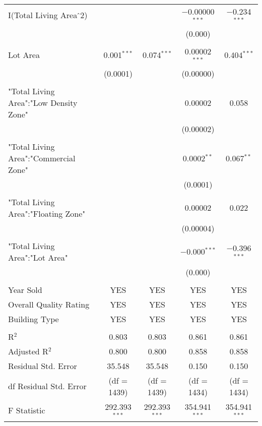 \documentclass[a4paper]{article}
\begin{document}
\begin{table}[!htbp]
\begin{adjustwidth}{-0.0cm}{-0cm}
\begin{threeparttable}
\begin{tabular}{@{\extracolsep{-1pt}}lcccc}
 I(Total Living Area$\hat{\mkern6mu}$2) &  &  & $-$0.00000$^{***}$ & $-$0.234$^{***}$ \\ 
  &  &  & (0.000) &  \\ 
  & & & & \\ 
 Lot Area & 0.001$^{***}$ & 0.074$^{***}$ & 0.00002$^{***}$ & 0.404$^{***}$ \\ 
  & (0.0001) &  & (0.00000) &  \\ 
  & & & & \\ 
 "Total Living Area":"Low Density Zone" &  &  & 0.00002 & 0.058 \\ 
  &  &  & (0.00002) &  \\ 
  & & & & \\ 
 "Total Living Area":"Commercial Zone" &  &  & 0.0002$^{**}$ & 0.067$^{**}$ \\ 
  &  &  & (0.0001) &  \\ 
  & & & & \\ 
 "Total Living Area":"Floating Zone" &  &  & 0.00002 & 0.022 \\ 
  &  &  & (0.00004) &  \\ 
  & & & & \\ 
 "Total Living Area":"Lot Area" &  &  & $-$0.000$^{***}$ & $-$0.396$^{***}$ \\ 
  &  &  & (0.000) &  \\ 
  & & & & \\ 
  Year Sold & YES & YES & YES & YES \\ 
  Overall Quality Rating & YES & YES & YES & YES \\  
  Building Type & YES & YES & YES & YES \\ 
\hline \\[-1.8ex] 
R$^{2}$ & 0.803 & 0.803 & 0.861 & 0.861 \\ 
Adjusted R$^{2}$ & 0.800 & 0.800 & 0.858 & 0.858 \\ 
Residual Std. Error & 35.548 & 35.548  & 0.150  & 0.150 \\
df Residual Std. Error & (df = 1439) & (df = 1439) & (df = 1434) & (df = 1434)\\
F Statistic & 292.393$^{***}$  & 292.393$^{***}$  & 354.941$^{***}$  & 354.941$^{***}$  \\ 

\end{tabular}
\end{threeparttable}
\end{adjustwidth}
\end{table}
\end{document}
